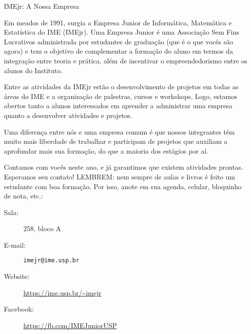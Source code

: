 \begin{subsecao}{IMEjr: A Nossa Empresa}


Em meados de 1991, surgia a Empresa Junior de Informática, Matemática e
Estatística do IME (IMEjr). Uma Empresa Junior é uma Associação Sem Fins
Lucrativos administrada por estudantes de graduação (que é o que vocês são
agora) e tem o objetivo de complementar a formação do aluno em termos da
integração entre teoria e prática, além de incentivar o empreendedorismo entre
os alunos do Instituto.

Entre as atividades da IMEjr estão o desenvolvimento de projetos em todas as
áreas do IME e a organização de palestras, cursos e workshops. Logo, estamos
abertos tanto a alunos interessados em aprender a administrar uma empresa
quanto a desenvolver atividades e projetos.

Uma diferença entre nós e uma empresa comum é que nossos integrantes têm muito
mais liberdade de trabalhar e participam de projetos que auxiliam a aprofundar
mais sua formação, do que a maioria dos estágios por aí.

Contamos com vocês neste ano, e já garantimos que existem atividades prontas.
Esperamos seu contato! LEMBREM: nem sempre de aulas e livros é feito um
estudante com boa formação. Por isso, anote em sua agenda, celular, bloquinho
de nota, etc.:

\begin{description}
\item [Sala:] 258, bloco A
\item[E-mail:] \tt{imejr@ime.usp.br}
\item[Website:] \url{https://ime.usp.br/~imejr}
\item[Facebook:] \url{https://fb.com/IMEJuniorUSP}
\end{description}

\end{subsecao}
